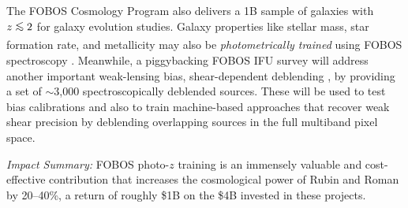 \documentclass[oneside,11pt]{amsart}
\DeclareRobustCommand{\lesssim}{%
\mathrel{\hskip-.5em\begin{array}{c}<\\[-8pt]\sim\end{array}\hskip-.5em}}
\begin{document}
The FOBOS Cosmology Program also delivers a 1B sample of galaxies with $z \lesssim 2$ for galaxy evolution studies.  Galaxy properties like stellar mass, star formation rate, and metallicity may also be \emph{photometrically trained} using FOBOS spectroscopy \citep[see][]{hemmati18}.  Meanwhile, a piggybacking FOBOS IFU survey will address another important weak-lensing bias, shear-dependent deblending \citep{sheldon20}, by providing a set of $\sim$3,000 spectroscopically deblended sources.  These will be used to test bias calibrations and also to train machine-based approaches that recover weak shear precision by deblending overlapping sources in the full multiband pixel space.

\medskip
\noindent \emph{Impact Summary:} FOBOS photo-$z$ training is an immensely valuable and cost-effective contribution that increases the cosmological power of Rubin and Roman by 20--40\%, a return of roughly \$1B on the \$4B invested in these projects.  





\end{document}
